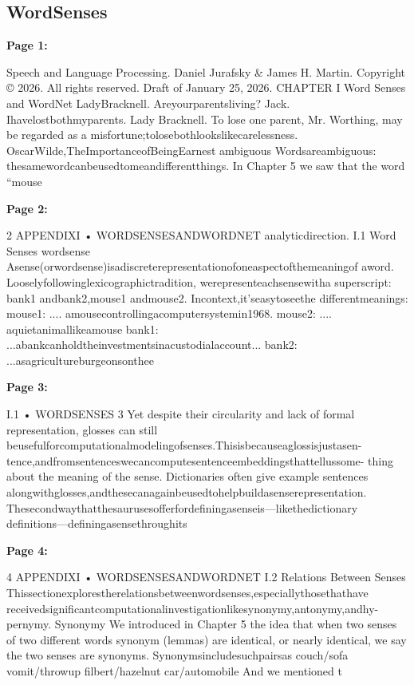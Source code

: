 \documentclass[11pt,a4paper]{article}
\begin{document}
\subsection{WordSenses}

\textbf{Page 1:}

Speech and Language Processing. Daniel Jurafsky & James H. Martin. Copyright © 2026. All
rights reserved. Draft of January 25, 2026.
CHAPTER
I Word Senses and WordNet
LadyBracknell. Areyourparentsliving?
Jack. Ihavelostbothmyparents.
Lady Bracknell. To lose one parent, Mr. Worthing, may be regarded as a
misfortune;tolosebothlookslikecarelessness.
OscarWilde,TheImportanceofBeingEarnest
ambiguous Wordsareambiguous: thesamewordcanbeusedtomeandifferentthings. In
Chapter 5 we saw that the word “mouse

\textbf{Page 2:}

2 APPENDIXI • WORDSENSESANDWORDNET
analyticdirection.
I.1 Word Senses
wordsense Asense(orwordsense)isadiscreterepresentationofoneaspectofthemeaningof
aword. Looselyfollowinglexicographictradition, werepresenteachsensewitha
superscript: bank1 andbank2,mouse1 andmouse2. Incontext,it’seasytoseethe
differentmeanings:
mouse1: .... amousecontrollingacomputersystemin1968.
mouse2: .... aquietanimallikeamouse
bank1: ...abankcanholdtheinvestmentsinacustodialaccount...
bank2: ...asagricultureburgeonsonthee

\textbf{Page 3:}

I.1 • WORDSENSES 3
Yet despite their circularity and lack of formal representation, glosses can still
beusefulforcomputationalmodelingofsenses.Thisisbecauseaglossisjustasen-
tence,andfromsentenceswecancomputesentenceembeddingsthattellussome-
thing about the meaning of the sense. Dictionaries often give example sentences
alongwithglosses,andthesecanagainbeusedtohelpbuildasenserepresentation.
Thesecondwaythatthesaurusesofferfordefiningasenseis—likethedictionary
definitions—definingasensethroughits

\textbf{Page 4:}

4 APPENDIXI • WORDSENSESANDWORDNET
I.2 Relations Between Senses
Thissectionexplorestherelationsbetweenwordsenses,especiallythosethathave
receivedsignificantcomputationalinvestigationlikesynonymy,antonymy,andhy-
pernymy.
Synonymy
We introduced in Chapter 5 the idea that when two senses of two different words
synonym (lemmas) are identical, or nearly identical, we say the two senses are synonyms.
Synonymsincludesuchpairsas
couch/sofa vomit/throwup filbert/hazelnut car/automobile
And we mentioned t
\end{document}
